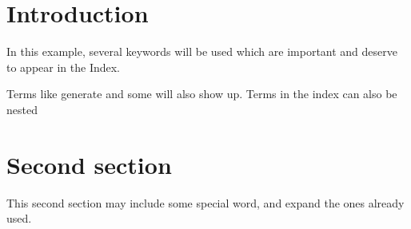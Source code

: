 \documentclass{article}
\begin{document}
\tableofcontents

\section{Introduction}
In this example, several keywords will be 
used which are important and deserve to appear in the 
Index.

Terms like generate and some 
will also show up. Terms in the index can also be 
nested 

\clearpage

\section{Second section}
This second section may include some special 
word, and expand the ones already used.

\printindex
\end{document}
